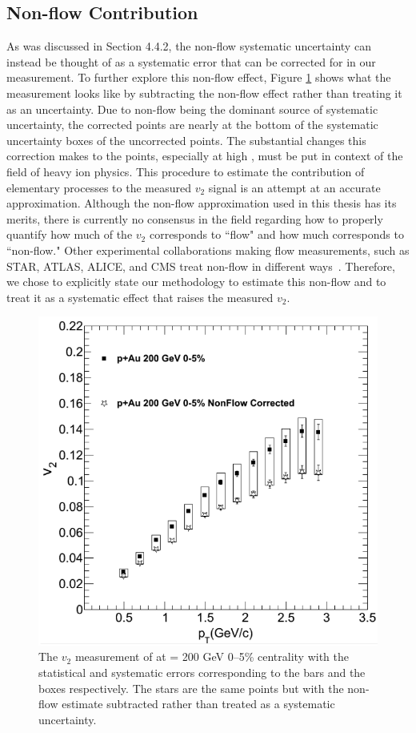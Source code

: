 \subsection{Non-flow Contribution}
\label{sec:ch5-non-flow}
As was discussed in Section 4.4.2, the non-flow systematic uncertainty can instead be thought of as a systematic error that can be corrected for in our measurement. To further explore this non-flow effect, Figure \ref{fig:pau_points_alone_nf} shows what the \pau measurement looks like by subtracting the  non-flow effect rather than treating it as an uncertainty. Due to non-flow being the dominant source of systematic uncertainty, the corrected \pau points are nearly at the bottom of the systematic uncertainty boxes of the uncorrected points.  The substantial changes this correction makes to the \pau points, especially at high \pt, must be put in context of the field of heavy ion physics. This procedure to estimate the contribution of elementary processes to the measured $v_2$ signal is an attempt at an accurate approximation. Although the non-flow approximation used in this thesis has its merits, there is currently no consensus in the field regarding how to properly quantify how much of the $v_2$ corresponds to ``flow" and how much corresponds to ``non-flow." Other experimental collaborations making flow measurements, such as STAR, ATLAS, ALICE, and CMS treat non-flow in different ways~\cite{Bożek2011}. Therefore, we chose to explicitly state our methodology to estimate this non-flow and to treat it as a systematic effect that raises the measured $v_2$. %

\begin{figure}[!ht]
\begin{center}
\includegraphics[width=0.65\linewidth]{figs/figure_w_nonflow_corr.png}
\caption{The $v_2$ measurement of \pau at \sqsn =  200 GeV 0--5\% centrality with the statistical and systematic errors corresponding to the bars and the boxes respectively. The stars are the same \pau points but with the non-flow estimate subtracted rather than treated as a systematic uncertainty.}
\label{fig:pau_points_alone_nf}
\end{center}
\end{figure}

